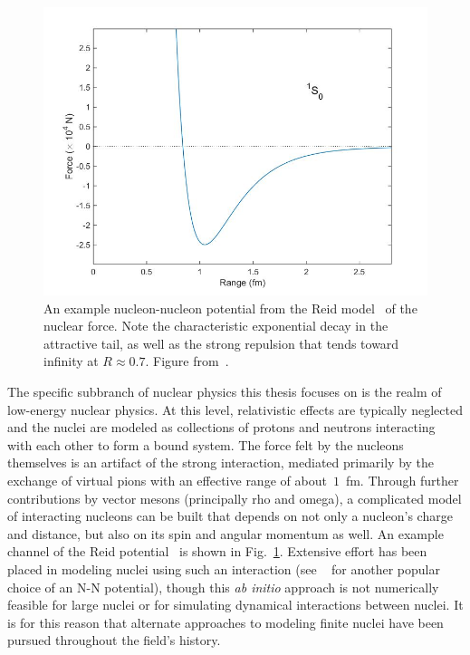 \begin{figure}[t]
	\includegraphics[width=\textwidth]{../Figures/intro_figs/ReidForce2.jpg}
	\caption{An example nucleon-nucleon potential from the Reid model~\citep{reid1968} of the nuclear force. Note the characteristic exponential decay in the attractive tail, as well as the strong repulsion that tends toward infinity at $R\approx0.7$. Figure from~\citep{bdushaw}.}
	\label{fig:reid}
\end{figure}

The specific subbranch of nuclear physics this thesis focuses on is the realm of low-energy nuclear physics.
At this level, relativistic effects are typically neglected and the nuclei are modeled as collections of protons and neutrons interacting with each other to form a bound system.
The force felt by the nucleons themselves is an artifact of the strong interaction, mediated primarily by the exchange of virtual pions with an effective range of about~$1$~fm.
Through further contributions by vector mesons (principally rho and omega), a complicated model of interacting nucleons can be built that depends on not only a nucleon's charge and distance, but also on its spin and angular momentum as well.
An example channel of the Reid potential~\citep{reid1968} is shown in Fig.~\ref{fig:reid}.
Extensive effort has been placed in modeling nuclei using such an interaction (see ~\citep{wiringa1995} for another popular choice of an N-N potential), though this \textit{ab initio} approach is not numerically feasible for large nuclei or for simulating dynamical interactions between nuclei.
It is for this reason that alternate approaches to modeling finite nuclei have been pursued throughout the field's history.

